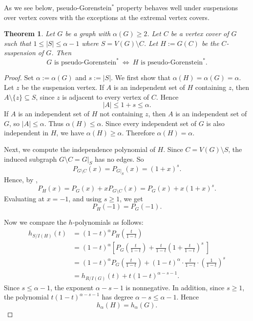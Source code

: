 \documentclass[12pt]{amsart}
\theoremstyle{plain}
\newtheorem{thm}{Theorem}[section]
\theoremstyle{definition}
\begin{document}
As we see below, pseudo-Gorenstein$^{*}$ property behaves well under suspensions over vertex covers with the exceptions at the extremal vertex covers. 


\begin{thm}\label{thm:co-suspension-preserves-PG-general}
Let \(G\) be a graph with \(\alpha(G)\ge 2\). Let $C$ be a vertex cover of $G$ such that \(
1\le|S|\le \alpha-1\) where $S= V(G) \setminus C$.
Let \(H:=G(C)\) be the \(C\)-suspension of \(G\).
Then
\[
G \text{ is pseudo-Gorenstein}^{*}\ \Longleftrightarrow\ H \text{ is pseudo-Gorenstein}^{*}.
\]
\end{thm}

\begin{proof}
Set $\alpha:=\alpha(G)$ and $s:=|S|$. We first show that \(\alpha(H)=\alpha(G)=\alpha\).
Let $z$ be the suspension vertex.  If \(A\) is an independent set of \(H\) containing \(z\), then
\(A\setminus\{z\}\subseteq S\), since \(z\) is adjacent to every vertex of \(C\).
Hence
\[
|A|\le1+s\le \alpha.
\]
If \(A\) is an independent set of \(H\) not containing \(z\), then \(A\) is an
independent set of \(G\), so \(|A|\le \alpha\).
Thus \(\alpha(H)\le \alpha\). Since every independent set of \(G\) is also
independent in \(H\), we have \(\alpha(H)\ge \alpha\). Therefore \(\alpha(H)=\alpha\).


Next, we compute the independence polynomial of \(H\).
Since \(C=V(G)\setminus S\), the induced subgraph \(G\setminus C=G|_S\) has no
edges. So
\[
P_{G\setminus C}(x)=P_{G|_S}(x)=(1+x)^s.
\]
Hence, by ,
\[
P_H(x)=P_G(x)+xP_{G\setminus C}(x)=P_G(x)+x(1+x)^s.
\]
Evaluating at \(x=-1\), and using \(s\ge 1\), we get
\begin{equation}\label{eq:PG-general-at-minus-one}
P_H(-1)=P_G(-1).
\end{equation}

Now we compare the \(h\)-polynomials as follows:
\begin{align*}
h_{S/I(H)}(t)
&=(1-t)^{\alpha}P_H\!\left(\frac{t}{1-t}\right)\\
&=(1-t)^{\alpha}\left[
P_G\!\left(\frac{t}{1-t}\right)+\frac{t}{1-t}
\left(1+\frac{t}{1-t}\right)^s ~
\right] \\
&=(1-t)^{\alpha}P_G\!\left(\frac{t}{1-t}\right)
+(1-t)^{\alpha}\cdot\frac{t}{1-t}\cdot
\left(\frac{1}{1-t}\right)^s\\
&=h_{R/I(G)}(t)+t(1-t)^{\alpha-s-1}.
\end{align*}
Since \(s\le \alpha-1\), the exponent \(\alpha-s-1\) is nonnegative. In addition, since
\(s\ge 1\), the polynomial \(t(1-t)^{\alpha-s-1}\) has degree \(\alpha-s\le \alpha-1\).
Hence
\begin{equation}\label{eq:top-h-general}
h_{\alpha}(H)=h_{\alpha}(G).
\end{equation}


\end{proof}
\end{document}
